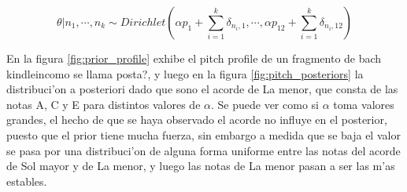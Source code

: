 $$\theta | n_1, \cdots, n_k \sim Dirichlet(\alpha p_1 + \sum_{i=1}^k \delta_{n_i,1}, \cdots, \alpha p_{12} + \sum_{i=1}^k \delta_{n_i,12})$$

En la figura \ref{fig:prior_profile} exhibe el pitch profile de un fragmento de bach kindlein\alert{como se llama posta?}, y luego en la figura \ref{fig:pitch_posteriors}
la distribuci'on a posteriori dado que sono el acorde de La menor, que consta de las notas A, C y E para distintos valores de $\alpha$. 
Se puede ver como si $\alpha$ toma valores grandes, el hecho
de que se haya observado el acorde no influye en el posterior, puesto que el prior tiene mucha fuerza, sin embargo a medida que se baja el valor se pasa por una 
distribuci'on de alguna forma uniforme entre las notas del acorde de Sol mayor y de La menor, y luego las notas de La menor pasan a ser las m'as estables.

\begin{imagen}
    \width{10cm}
\end{imagen}

